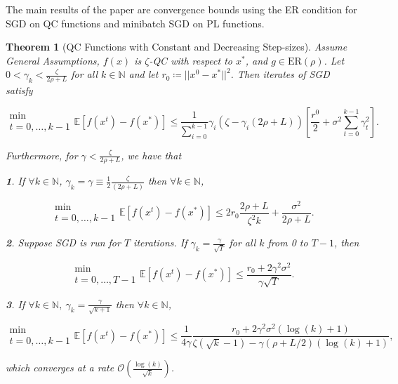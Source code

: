 \documentclass{article}
\newtheorem{theorem}{Theorem}[section]
\begin{document}
The main results of the paper are convergence bounds using the ER condition for SGD on QC functions and minibatch SGD on PL functions.
\begin{theorem}[QC Functions with Constant and Decreasing Step-sizes]
	Assume \textit{General Assumptions}, $f(x)$ is $\zeta$-QC with respect to $x^*$, and $g\in\text{ER}(\rho)$. Let $0 < \gamma_k < \frac{\zeta}{2\rho + L}$ for all $k\in\mathbb{N}$ and let $r_0\coloneqq ||x^0 - x^*||^2$.
	Then iterates of SGD satisfy

	\[
		\substack{\min \\ t=0,\dots, k-1}\mathbb{E}\left[f(x^t) - f(x^*)\right] \leq \frac{1}{\sum_{i=0}^{k-1}}\gamma_i (\zeta - \gamma_i (2\rho + L)) \left[\frac{r^0}{2} + \sigma^2 \sum^{k-1}_{t=0}\gamma_t^2\right].
	\]

	Furthermore, for $\gamma < \frac{\zeta}{2\rho + L}$, we have that

	\textbf{1}. If $\forall k\in\mathbb{N}$, $\gamma_k = \gamma \equiv \frac{1}{2}\frac{\zeta}{(2\rho + L)}$ then $\forall k\in\mathbb{N}$,

	\[
		\substack{\min \\ t=0,\dots, k-1}\mathbb{E}[f(x^t) - f(x^*)]\leq 2r_0 \frac{2\rho + L}{\zeta^2 k} + \frac{\sigma^2}{2\rho + L}.
	\]

	\textbf{2}. Suppose SGD is run for $T$ iterations. If $\gamma_k = \frac{\gamma}{\sqrt{T}}$ for all $k$ from 0 to $T-1$, then

	\[
		\substack{\min \\ t=0,\dots, T-1} \mathbb{E}[f(x^t) - f(x^*)] \leq \frac{r_0 + 2\gamma^2 \sigma^2}{\gamma\sqrt{T}}.
	\]

	\textbf{3}. If $\forall k\in\mathbb{N},\ \gamma_k = \frac{\gamma}{\sqrt{k+1}}$ then $\forall k \in\mathbb{N}$,

	\[
		\substack{\min \\ t=0,\dots, k-1} \mathbb{E}[f(x^t) - f(x^*)] \leq \frac{1}{4\gamma} \frac{r_0 + 2\gamma^2 \sigma^2 (\log{(k)} + 1)}{\zeta (\sqrt{k} - 1) - \gamma(\rho + L/2)(\log{(k)} + 1)},
	\]

	which converges at a rate $\mathcal{O}\left(\frac{\log(k)}{\sqrt{k}}\right)$.
\end{theorem}
\end{document}
